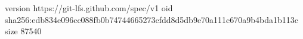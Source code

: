 version https://git-lfs.github.com/spec/v1
oid sha256:edb834e096cc088fb0b74744665273cfdd8d5db9e70a111c670a9b4bda1b113c
size 87540
